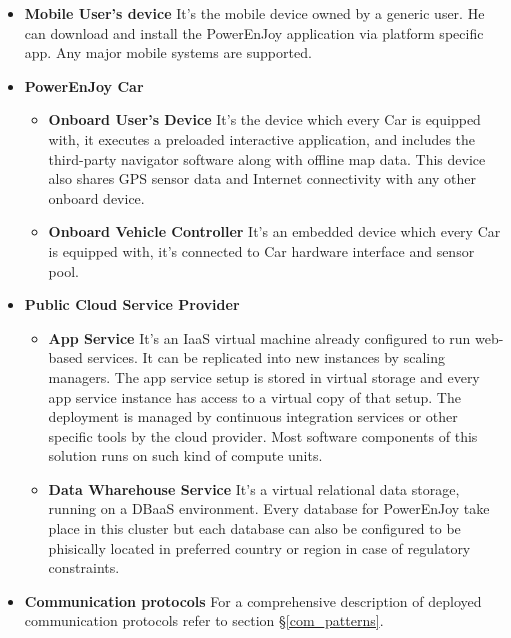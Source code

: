 \begin{itemize}
    \item\textbf{Mobile User's device}\newline
    It's the mobile device owned by a generic user. He can download and install the PowerEnJoy application via platform specific app. Any major mobile systems are supported.
    \item\textbf{PowerEnJoy Car}
    \begin{itemize}
        \item\textbf{Onboard User's Device}\newline
        It's the device which every Car is equipped with, it executes a preloaded interactive application, and includes the third-party navigator software along with offline map data. This device also shares GPS sensor data and Internet connectivity with any other onboard device.
        \item\textbf{Onboard Vehicle Controller}\newline
        It's an embedded device which every Car is equipped with, it's connected to Car hardware interface and sensor pool.
    \end{itemize}
    \item\textbf{Public Cloud Service Provider}
    \begin{itemize}
        \item\textbf{App Service}\newline
        It's an IaaS virtual machine already configured to run web-based services. It can be replicated into new instances by scaling managers. The app service setup is stored in virtual storage and every app service instance has access to a virtual copy of that setup. The deployment is managed by continuous integration services or other specific tools by the cloud provider. Most software components of this solution runs on such kind of compute units.
        \item\textbf{Data Wharehouse Service}\newline
        It's a virtual relational data storage, running on a DBaaS environment. Every database for PowerEnJoy take place in this cluster but each database can also be configured to be phisically located in preferred country or region in case of regulatory constraints.
    \end{itemize}
    \item\textbf{Communication protocols}\newline
    For a comprehensive description of deployed communication protocols refer to section §\ref{com_patterns}.
\end{itemize}


